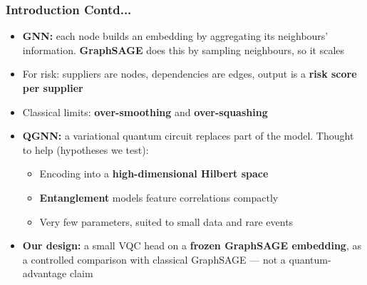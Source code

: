 \documentclass{beamer}
\newcommand{\bodyfont}{\small}
\begin{document}
\begin{frame}
\frametitle{Introduction Contd...}
\bodyfont
\begin{itemize}
  \item \textbf{GNN:} each node builds an embedding by aggregating its
        neighbours' information. \textbf{GraphSAGE} does this by sampling
        neighbours, so it scales
  \vspace{0.4em}
  \item For risk: suppliers are nodes, dependencies are edges, output is a
        \textbf{risk score per supplier}
  \vspace{0.4em}
  \item Classical limits: \textbf{over-smoothing} and \textbf{over-squashing}
  \vspace{0.4em}
  \item \textbf{QGNN:} a variational quantum circuit replaces part of the model.
        Thought to help (hypotheses we test):
  \begin{itemize}
    \item Encoding into a \textbf{high-dimensional Hilbert space}
    \item \textbf{Entanglement} models feature correlations compactly
    \item Very few parameters, suited to small data and rare events
  \end{itemize}
  \vspace{0.4em}
  \item \textbf{Our design:} a small VQC head on a \textbf{frozen GraphSAGE
        embedding}, as a controlled comparison with classical GraphSAGE ---
        not a quantum-advantage claim
\end{itemize}
\end{frame}

\end{document}

